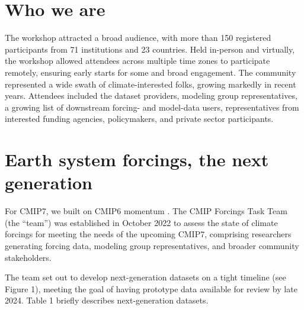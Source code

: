\documentclass{ametsocV6.1}
\begin{document}
\section*{Who we are}
The workshop attracted a broad audience, with more than 150 registered participants from 71 institutions and 23 countries. Held in-person and virtually, the workshop allowed attendees across multiple time zones to participate remotely, ensuring early starts for some and broad engagement. The community represented a wide swath of climate-interested folks, growing markedly in recent years. Attendees included the dataset providers, modeling group representatives, a growing list of downstream forcing- and model-data users, representatives from interested funding agencies, policymakers, and private sector participants.

\section*{Earth system forcings, the next generation}
For CMIP7, we built on CMIP6 momentum \citep{durack_toward_2018}. The CMIP Forcings Task Team (the ``team'') was established in October 2022 to assess the state of climate forcings for meeting the needs of the upcoming CMIP7, comprising researchers generating forcing data, modeling group representatives, and broader community stakeholders.

The team set out to develop next-generation datasets on a tight timeline (see Figure 1), meeting the goal of having prototype data available for review by late 2024. Table 1 briefly describes next-generation datasets.
\end{document}
